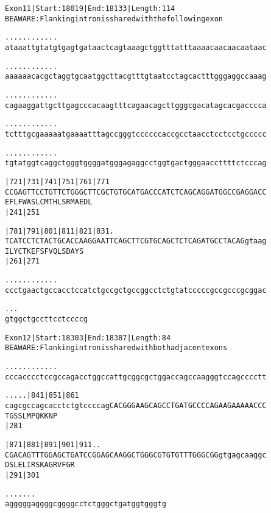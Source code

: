 \documentclass{article}
\begin{document}
\begin{alltt}
Exon 11 | Start: 18019 | End: 18133 | Length: 114
BE AWARE: Flanking intron is shared with the following exon

.    .    .    .    .    .    .    .    .    .    .    .    
ataaattgtatgtgagtgataactcagtaaagctggtttatttaaaacaacaacaataac

.    .    .    .    .    .    .    .    .    .    .    .    
aaaaaacacgctaggtgcaatggcttacgtttgtaatcctagcactttgggaggccaaag

.    .    .    .    .    .    .    .    .    .    .    .    
cagaaggattgcttgagcccacaagtttcagaacagcttgggcgacatagcacgacccca

.    .    .    .    .    .    .    .    .    .    .    .    
tctttgcgaaaaatgaaaatttagccgggtccccccaccgcctaacctcctcctgccccc

.    .    .    .    .    .    .    .    .    .    .    .    
tgtatggtcaggctgggtggggatgggagaggcctggtgactgggaaccttttctcccag

  |721      |731      |741      |751      |761      |771    
CCGAGTTCCTGTTCTGGGCTTCGCTGTGCATGACCCATCTCAGCAGGATGGCCGAGGACC
  E  F  L  F  W  A  S  L  C  M  T  H  L  S  R  M  A  E  D  L
  |241                          |251                        

  |781      |791      |801      |811      |821      |831   .
TCATCCTCTACTGCACCAAGGAATTCAGCTTCGTGCAGCTCTCAGATGCCTACAGgtaag
  I  L  Y  C  T  K  E  F  S  F  V  Q  L  S  D  A  Y  S      
  |261                          |271                        

    .    .    .    .    .    .    .    .    .    .    .    .
ccctgaactgccacctccatctgccgctgccggcctctgtatcccccgccgcccgcggac

    .    .    .    
gtggctgccttcctccccg
\end{alltt}
\newpage
\begin{alltt}
Exon 12 | Start: 18303 | End: 18387 | Length: 84
BE AWARE: Flanking intron is shared with both adjacent exons

.    .    .    .    .    .    .    .    .    .    .    .    
cccacccctccgccagacctggccattgcggcgctggaccagccaagggtccagcccctt

.    .    .    .    .          |841      |851      |861     
cagcgccagcacctctgtccccagCACGGGAAGCAGCCTGATGCCCCAGAAGAAAAACCC
                         T  G  S  S  L  M  P  Q  K  K  N  P 
                               |281                         

 |871      |881      |891      |901      |911        .    . 
CGACAGTTTGGAGCTGATCCGGAGCAAGGCTGGGCGTGTGTTTGGGCGGgtgagcaaggc
 D  S  L  E  L  I  R  S  K  A  G  R  V  F  G  R             
 |291                          |301                         

   .    .    .    .    .    .    .   
agggggaggggcggggcctctgggctgatggtgggtg
\end{alltt}
\end{document}
